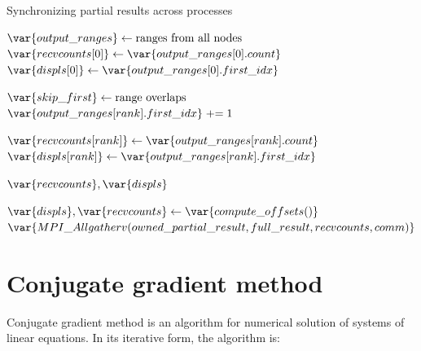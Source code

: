 \documentclass[thesis=M,english]{FITthesis}[2019/12/23]
\begin{document}
\newcommand{\pluseq}{\mathrel{+}=}
\begin{algorithm}[htp]
    \caption{Synchronizing partial results across processes}
    \begin{algorithmic}
        \State $\var{output\_ranges} \gets \text{ranges from all nodes}$
        \State $\var{recvcounts[0]} \gets \var{output\_ranges[0].count}$
        \State $\var{displs[0]} \gets \var{output\_ranges[0].first\_idx}$


        \State $\var{skip\_first} \gets \text{range overlaps}$
        \State $\var{output\_ranges[rank].first\_idx} \pluseq 1$
        \EndIf

        \State $\var{recvcounts[rank]} \gets \var{output\_ranges[rank].count}$
        \State $\var{displs[rank]} \gets \var{output\_ranges[rank].first\_idx}$

        \EndFor

        \Return $\var{recvcounts}, \var{displs}$

        \EndFunction

        \State $\var{displs}, \var{recvcounts} \gets \var{compute\_offsets()}$
        \State $\var{MPI\_Allgatherv(owned\_partial\_result, full\_result, recvcounts, comm)}$

        \EndFunction
    \end{algorithmic}
\end{algorithm}

\chapter{Conjugate gradient method}

Conjugate gradient method is an algorithm for numerical solution of systems of linear
equations. In its iterative form, the algorithm is:
\end{document}
